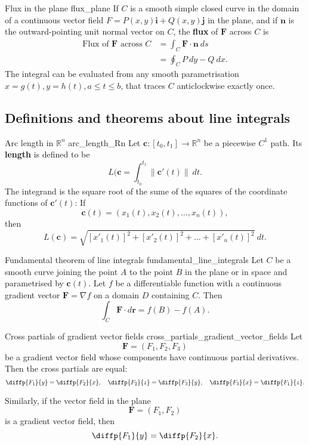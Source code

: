\begin{definition}{Flux in the plane \cite{thomas_calculus}}{flux_plane}
If $C$ is a smooth  simple closed curve in the domain of a continuous vector field $F = P(x, y) \mathbf{i} + Q(x, y) \mathbf{j}$ in the plane, and if $\mathbf{n}$ is the outward-pointing unit normal vector on $C$, the \textbf{flux} of $\mathbf{F}$ across $C$ is
\begin{align*}
\text{Flux of } \mathbf{F} \text{ across } C &= \int_C \mathbf{F} \cdot \mathbf{n} \ ds \\
&= \oint_C P \ dy - Q \ dx .
\end{align*}
The integral can be evaluated from any smooth parametrisation $x = g(t), y = h(t), a \leq t \leq b$, that traces $C$ anticlockwise exactly once.
\end{definition}

\subsection{Definitions and theorems about line integrals}

\begin{definition}{Arc length in $\mathbb{R}^n$ \cite{marsden_vector_calculus}}{arc_length_Rn}
Let $\mathbf{c}: [t_0, t_1] \to \mathbb{R}^n$ be a piecewise $C^1$ path. Its \textbf{length} is defined to be
$$ L(\mathbf{c} = \int_{t_0}^{t_1} \lVert \mathbf{c}'(t) \rVert \ dt . $$
The integrand is the square root of the sume of the squares of the coordinate functions of $\mathbf{c}'(t)$: If
$$ \mathbf{c}(t) = (x_1(t), x_2(t), ..., x_n(t)) , $$
then
$$ L(\mathbf{c}) = \sqrt{[x'_1(t)]^2 + [x'_2(t)]^2 + ... + [x'_n(t)]^2} \ dt . $$
\end{definition}

\begin{theorem}{Fundamental theorem of line integrals \cite{thomas_calculus}}{fundamental_line_integrals}
Let $C$ be a smooth curve joining the point $A$ to the point $B$ in the plane or in space and parametrised by $\mathbf{c}(t)$. Let $f$ be a differentiable function with a continuous gradient vector $\mathbf{F} = \nabla f$ on a domain $D$ containing $C$. Then
$$ \int_C \mathbf{F} \cdot d \mathbf{r} = f(B) - f(A) . $$
\end{theorem}

\begin{theorem}{Cross partials of gradient vector fields \cite{math2111_notes}}{cross_partials_gradient_vector_fields}
Let
$$ \mathbf{F} = (F_1, F_2, F_3) $$
be a gradient vector field whose components have continuous partial derivatives. Then the cross partials are equal:
$$ \diffp{F_1}{y} = \diffp{F_2}{x}, \quad \diffp{F_2}{z} = \diffp{F_3}{y}, \quad \diffp{F_3}{x} = \diffp{F_1}{z} . $$

Similarly, if the vector field in the plane
$$ \mathbf{F} = (F_1, F_2) $$
is a gradient vector field, then
$$ \diffp{F_1}{y} = \diffp{F_2}{x} . $$
\end{theorem}

